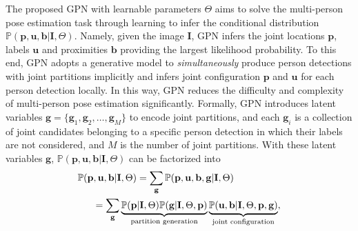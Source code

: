 \documentclass[10pt,twocolumn,letterpaper]{article}
\begin{document}
The proposed GPN  with learnable parameters $\Theta$ aims  to  solve the multi-person pose estimation task through learning to infer the conditional distribution $\mathbb{P}(\mathbf{p}, \mathbf{u}, \mathbf{b} | \mathbf{I}, \Theta)$. Namely,  given the image $\mathbf{I}$, GPN infers the joint locations $\mathbf{p}$, labels $\mathbf{u}$ and proximities $\mathbf{b}$ providing the largest likelihood probability. To this end,  GPN adopts a generative model to \emph{simultaneously} produce person detections with joint partitions implicitly and infers joint configuration $\mathbf{p}$ and  $\mathbf{u}$ for each person detection locally. In this way, GPN reduces the difficulty and complexity of multi-person pose estimation significantly. Formally, GPN introduces latent variables  $\mathbf{g}{=}\{\mathbf{g}_1,\mathbf{g}_2,\ldots,\mathbf{g}_M\}$ to encode joint partitions, and each $\mathbf{g}_i$ is a collection of joint candidates belonging  to a specific person detection in which their labels are not considered, and $M$ is the number of joint partitions.
With these latent variables $\mathbf{g}$, $\mathbb{P}(\mathbf{p}, \mathbf{u}, \mathbf{b} | \mathbf{I}, \Theta)$ can be factorized  into
\begin{equation}\label{eq:basic_model}
\begin{aligned}
\mathbb{P}(\mathbf{p}, \mathbf{u}, \mathbf{b} | \mathbf{I}, \Theta) & = \sum_{\mathbf{g}}\mathbb{P}(\mathbf{p}, \mathbf{u}, \mathbf{b}, \mathbf{g} | \mathbf{I}, \Theta) \\
& \hspace{-16mm } = \sum_{\mathbf{g}} \underbrace{\mathbb{P}(\mathbf{p}|\mathbf{I}, \Theta)\mathbb{P}(\mathbf{g}|\mathbf{I}, \Theta, \mathbf{p})}_{\text{partition generation}} \underbrace{\mathbb{P}(\mathbf{u}, \mathbf{b}|\mathbf{I}, \Theta, \mathbf{p}, \mathbf{g})}_{\text{joint configuration}},
\end{aligned}
\end{equation}
\end{document}
